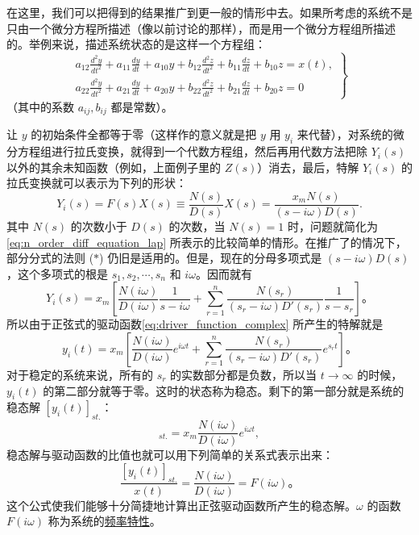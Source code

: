 在这里，我们可以把得到的结果推广到更一般的情形中去。如果所考虑的系统不是只由一个微分方程所描述（像以前讨论的那样），而是用一个微分方程组所描述的。举例来说，描述系统状态的是这样一个方程组：
\begin{equation*}
\left.
\begin{array}{l}
a_{12} \frac{d^2 y}{dt^2} + a_{11} \frac{dy}{dt} + a_{10} y + b_{12} \frac{d^2 z}{dt^2} + b_{11} \frac{dz}{dt} + b_{10} z = x(t),\\
a_{22} \frac{d^2 y}{dt^2} + a_{21} \frac{dy}{dt} + a_{20} y + b_{22} \frac{d^2 z}{dt^2} + b_{21} \frac{dz}{dt} + b_{20} z = 0
\end{array}
\right\}
\end{equation*}
（其中的系数 $a_{ij}, b_{ij}$ 都是常数）。

让 $y$ 的初始条件全都等于零（这样作的意义就是把 $y$ 用 $y_i$ 来代替），对系统的微分方程组进行拉氏变换，就得到一个代数方程组，然后再用代数方法把除 $Y_i(s)$ 以外的其余未知函数（例如，上面例子里的 $Z(s)$）消去，最后，特解 $Y_i(s)$ 的拉氏变换就可以表示为下列的形状：
\begin{equation}\label{eq:particular_solution_lap}
Y_i(s) = F(s) X(s) \equiv \frac{N(s)}{D(s)} X(s) = \frac{x_m N(s)}{(s - i \omega) D(s)}.
\end{equation}
其中 $N(s)$ 的次数小于 $D(s)$ 的次数，当 $N(s)=1$ 时，问题就简化为\eqref{eq:n_order_diff_equation_lap} 所表示的比较简单的情形。在推广了的情况下，部分分式的法则 ($*$) 仍旧是适用的。但是，现在的分母多项式是 $(s-i\omega)D(s)$，这个多项式的根是 $s_1,s_2,\cdots,s_n$ 和 $i\omega$。因而就有
\begin{equation}
Y_i(s) = x_m \left[ \frac{N(i\omega)}{D(i\omega)} \frac{1}{s-i\omega} + \sum_{r=1}^n \frac{N(s_r)}{(s_r-i\omega)D'(s_r)} \frac{1}{s-s_r} \right]。
\end{equation}
所以由于正弦式的驱动函数\eqref{eq:driver_function_complex} 所产生的特解就是
\begin{equation}
y_i(t) = x_m \left[ \frac{N(i\omega)}{D(i\omega)} e^{i\omega t} + \sum_{r=1}^n \frac{N(s_r)}{(s_r-i\omega)D'(s_r)} e^{s_r t} \right]。
\end{equation}
对于稳定的系统来说，所有的 $s_r$ 的实数部分都是负数，所以当 $t \to \infty$ 的时候，$y_i(t)$ 的第二部分就等于零。这时的状态称为稳态。剩下的第一部分就是系统的稳态解 $[y_i(t)]_{st.}$：
\begin{equation*}
[y_i(t)]_{st.} = x_m \frac{N(i\omega)}{D(i\omega)} e^{i\omega t},
\end{equation*}
稳态解与驱动函数的比值也就可以用下列简单的关系式表示出来：
\begin{equation}\label{eq:ratio_of_steady_solution_to_function}
\frac{[y_i(t)]_{st.}}{x(t)} = \frac{N(i\omega)}{D(i\omega)} = F(i\omega)。
\end{equation}
这个公式使我们能够十分简捷地计算出正弦驱动函数所产生的稳态解。$\omega$ 的函数 $F(i\omega)$ 称为系统的\underline{频率特性}。

